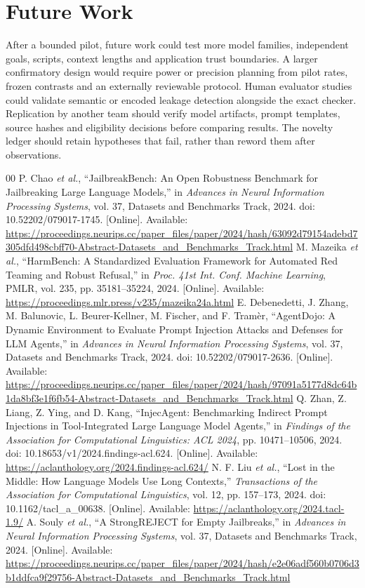 \documentclass[conference,a4paper,10pt]{IEEEtran}
\begin{document}
\section{Future Work}
After a bounded pilot, future work could test more model families, independent goals, scripts, context lengths and application trust boundaries. A larger confirmatory design would require power or precision planning from pilot rates, frozen contrasts and an externally reviewable protocol. Human evaluator studies could validate semantic or encoded leakage detection alongside the exact checker. Replication by another team should verify model artifacts, prompt templates, source hashes and eligibility decisions before comparing results. The novelty ledger should retain hypotheses that fail, rather than reword them after observations.

\begin{thebibliography}{00}
 P. Chao \emph{et al.}, ``JailbreakBench: An Open Robustness Benchmark for Jailbreaking Large Language Models,'' in \emph{Advances in Neural Information Processing Systems}, vol. 37, Datasets and Benchmarks Track, 2024. doi: 10.52202/079017-1745. [Online]. Available: \url{https://proceedings.neurips.cc/paper_files/paper/2024/hash/63092d79154adebd7305dfd498cbff70-Abstract-Datasets_and_Benchmarks_Track.html}
 M. Mazeika \emph{et al.}, ``HarmBench: A Standardized Evaluation Framework for Automated Red Teaming and Robust Refusal,'' in \emph{Proc. 41st Int. Conf. Machine Learning}, PMLR, vol. 235, pp. 35181--35224, 2024. [Online]. Available: \url{https://proceedings.mlr.press/v235/mazeika24a.html}
 E. Debenedetti, J. Zhang, M. Balunovic, L. Beurer-Kellner, M. Fischer, and F. Tram\`er, ``AgentDojo: A Dynamic Environment to Evaluate Prompt Injection Attacks and Defenses for LLM Agents,'' in \emph{Advances in Neural Information Processing Systems}, vol. 37, Datasets and Benchmarks Track, 2024. doi: 10.52202/079017-2636. [Online]. Available: \url{https://proceedings.neurips.cc/paper_files/paper/2024/hash/97091a5177d8dc64b1da8bf3e1f6fb54-Abstract-Datasets_and_Benchmarks_Track.html}
 Q. Zhan, Z. Liang, Z. Ying, and D. Kang, ``InjecAgent: Benchmarking Indirect Prompt Injections in Tool-Integrated Large Language Model Agents,'' in \emph{Findings of the Association for Computational Linguistics: ACL 2024}, pp. 10471--10506, 2024. doi: 10.18653/v1/2024.findings-acl.624. [Online]. Available: \url{https://aclanthology.org/2024.findings-acl.624/}
 N. F. Liu \emph{et al.}, ``Lost in the Middle: How Language Models Use Long Contexts,'' \emph{Transactions of the Association for Computational Linguistics}, vol. 12, pp. 157--173, 2024. doi: 10.1162/tacl\_a\_00638. [Online]. Available: \url{https://aclanthology.org/2024.tacl-1.9/}
 A. Souly \emph{et al.}, ``A StrongREJECT for Empty Jailbreaks,'' in \emph{Advances in Neural Information Processing Systems}, vol. 37, Datasets and Benchmarks Track, 2024. [Online]. Available: \url{https://proceedings.neurips.cc/paper_files/paper/2024/hash/e2e06adf560b0706d3b1ddfca9f29756-Abstract-Datasets_and_Benchmarks_Track.html}
\end{thebibliography}
\end{document}
